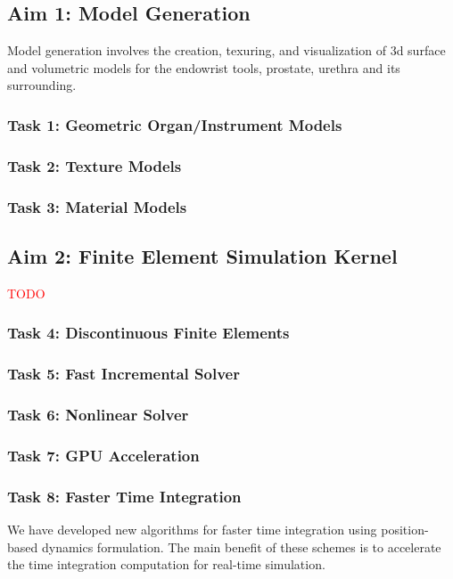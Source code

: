 \subsection{Aim 1: Model Generation}
Model generation involves the creation, texuring, and visualization of 3d surface and volumetric models for the endowrist tools, prostate, urethra and its surrounding.

\subsubsection{Task 1: Geometric Organ/Instrument Models}
\subsubsection{Task 2: Texture Models}
\subsubsection{Task 3: Material Models}

\subsection{Aim 2: Finite Element Simulation Kernel}
\textcolor{Red}{TODO}

\subsubsection{Task 4: Discontinuous Finite Elements}
\subsubsection{Task 5: Fast Incremental Solver}
\subsubsection{Task 6: Nonlinear Solver}
\subsubsection{Task 7: GPU Acceleration}
\subsubsection{Task 8: Faster Time Integration} We have developed new algorithms for faster time integration using position-based dynamics formulation. The main benefit of these schemes is to accelerate the time integration computation for real-time simulation.

